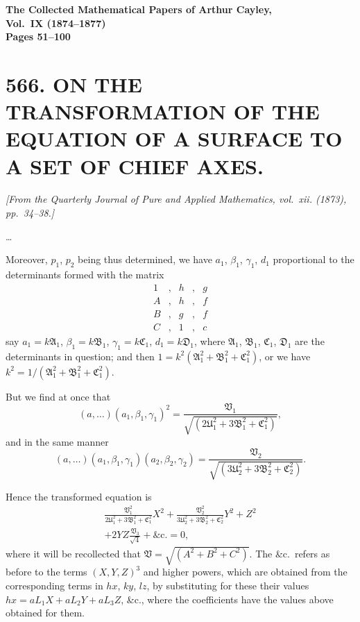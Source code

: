 \documentclass[11pt,a4paper]{article}
\theoremstyle{plain}
\theoremstyle{definition}
\theoremstyle{remark}
\newcommand{\paper}[2]{\section*{#1 #2}}
\newcommand{\papersource}[1]{\par\noindent\textit{#1}\par\medskip}
\begin{document}
\begin{center}
\Large\textbf{The Collected Mathematical Papers of Arthur Cayley,\\Vol.~IX (1874--1877)}\\[1em]
\large\textbf{Pages 51--100}
\end{center}

\tableofcontents
\newpage

\paper{566.}{ON THE TRANSFORMATION OF THE EQUATION OF A SURFACE TO A SET OF CHIEF AXES.}

\papersource{[From the Quarterly Journal of Pure and Applied Mathematics, vol.~xii. (1873), pp.~34--38.]}

\ldots

Moreover, $p_1$, $p_2$ being thus determined, we have $a_1$, $\beta_1$, $\gamma_1$, $d_1$ proportional to the determinants formed with the matrix
\[
\begin{array}{ccccc}
1 & , & h & , & g \\
A & , & h & , & f \\
B & , & g & , & f \\
C & , & 1 & , & c
\end{array}
\]
say $a_1 = k\mathfrak{A}_1$, $\beta_1 = k\mathfrak{B}_1$, $\gamma_1 = k\mathfrak{C}_1$, $d_1 = k\mathfrak{D}_1$, where $\mathfrak{A}_1$, $\mathfrak{B}_1$, $\mathfrak{C}_1$, $\mathfrak{D}_1$ are the determinants in question; and then $1 = k^2(\mathfrak{A}_1^2 + \mathfrak{B}_1^2 + \mathfrak{C}_1^2)$, or we have $k^2 = 1/(\mathfrak{A}_1^2 + \mathfrak{B}_1^2 + \mathfrak{C}_1^2)$.

But we find at once that
\[
(a,\ldots)(a_1, \beta_1, \gamma_1)^2 = \frac{\mathfrak{V}_1}{\sqrt{(2\mathfrak{U}_1^2 + 3\mathfrak{B}_1^2 + \mathfrak{C}_1^2)}},
\]
and in the same manner
\[
(a,\ldots)(a_1, \beta_1, \gamma_1)(a_2, \beta_2, \gamma_2) = \frac{\mathfrak{V}_2}{\sqrt{(3\mathfrak{U}_2^2 + 3\mathfrak{B}_2^2 + \mathfrak{C}_2^2)}}.
\]

Hence the transformed equation is
\begin{multline*}
\frac{\mathfrak{V}_1^2}{2\mathfrak{U}_1^2 + 3\mathfrak{B}_1^2 + \mathfrak{C}_1^2}X^2 + \frac{\mathfrak{V}_2^2}{3\mathfrak{U}_2^2 + 3\mathfrak{B}_2^2 + \mathfrak{C}_2^2}Y^2 + Z^2 \\
+ 2YZ\frac{\mathfrak{V}_3}{\sqrt{4}} + \&\text{c.} = 0,
\end{multline*}
where it will be recollected that $\mathfrak{V} = \sqrt{(A^2 + B^2 + C^2)}$. The \&c.\ refers as before to the terms $(X,Y,Z)^3$ and higher powers, which are obtained from the corresponding terms in $hx$, $ky$, $lz$, by substituting for these their values $hx = aL_1X + aL_2Y + aL_3Z$, \&c., where the coefficients have the values above obtained for them.
\end{document}
